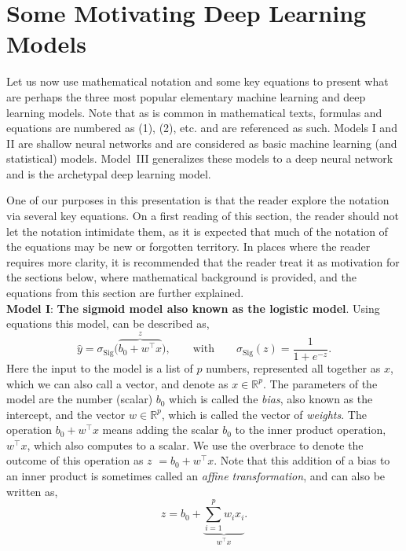 \documentclass[12pt]{article}
\begin{document}
\section{Some Motivating Deep Learning Models}
\label{sec:motivating-deep-learning-models}

Let us now use mathematical notation and some key equations to present what are perhaps the three most popular elementary machine learning and deep learning models. Note that as is common in mathematical texts, formulas and equations are numbered as (1), (2), etc. and are referenced as such. Models I and II are shallow neural networks and are considered as basic machine learning (and statistical) models. Model~III generalizes these models to a deep neural network and is the archetypal deep learning model.

One of our purposes in this presentation is that the reader explore the notation via several key equations. On a first reading of this section, the reader should not let the notation intimidate them, as it is expected that much of the notation of the equations may be new or forgotten territory. In places where the reader requires more clarity, it is recommended that the reader treat it as motivation for the sections below, where mathematical background is provided, and the equations from this section are further explained. \\

\noindent
{\bf Model I}: {\bf The sigmoid model also known as the logistic model}. Using equations this model, can be described as,
%
\begin{equation}
\label{eq:first-shallow-view}
\hat{y}=\sigma_{\text{Sig}}\big(\overbrace{b_0+w^\top  x}^{z}\big),
\qquad
\text{with}
\qquad
\sigma_{\text{Sig}}(z) = \frac{1}{1+e^{-z}}.
\end{equation}
%
Here the input to the model is a list of $p$ numbers, represented all together as $x$, which we can also call a vector, and denote as $x\in {\mathbb R}^p$. The parameters of the model are the number (scalar) $b_0$ which is called the {\em bias}, also known as the intercept, and the vector $w\in {\mathbb R}^p$, which is called the vector of {\em weights}. The operation $b_0 + w^\top x$ means adding the scalar $b_0$ to the inner product operation, $w^\top x$, which also computes to a scalar. We use the overbrace to denote the outcome of this operation as $z$ $=b_0+w^\top x$. Note that this addition of a bias to an inner product is sometimes called an {\em affine transformation}, and can also be written as,
%
\begin{equation}
\label{eq:smallz-only-log-mult}
z = b_0 + \underbrace{\sum_{i=1}^p w_i x_i}_{w^\top x}.
\end{equation}
\end{document}
